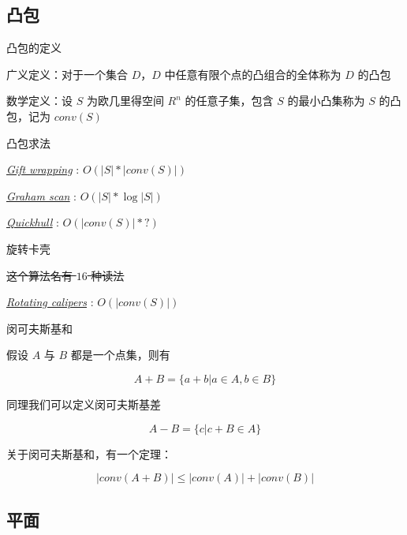 \documentclass[UTF8]{beamer}
\begin{document}
		\subsection{凸包}

			\begin{frame}{凸包的定义}

			广义定义：对于一个集合 $D$，$D$ 中任意有限个点的凸组合的全体称为 $D$ 的凸包

			数学定义：设 $S$ 为欧几里得空间 $R^n$ 的任意子集，包含 $S$ 的最小凸集称为 $S$ 的凸包，记为 $conv(S)$

			\end{frame}

			\begin{frame}{凸包求法}

			\href{Gift_wrapping_algorithm.gif}{\emph{\underline{Gift wrapping}}} : $O(|S|*|conv(S)|)$ 

			\href{Graham_scan.gif}{\emph{\underline{Graham scan}}} : $O(|S|*\log |S|)$

			\href{Quickhull.gif}{\emph{\underline{Quickhull}}} : $O(|conv(S)|*?)$

			\end{frame}

			\begin{frame}{旋转卡壳}

			\sout{这个算法名有 $16$ 种读法}

			\href{Rotating_calipers.gif}{\emph{\underline{Rotating calipers}}} : $O(|conv(S)|)$

			\end{frame}

			\begin{frame}{闵可夫斯基和}

			假设 $A$ 与 $B$ 都是一个点集，则有

			$$
			A + B = \{ a + b | a \in A, b \in B \}
			$$

			同理我们可以定义闵可夫斯基差

			$$
			A - B = \{ c | c + B \in A \}
			$$

			\pause

			关于闵可夫斯基和，有一个定理：

			$$
			|conv(A+B)| \le |conv(A)| + |conv(B)|
			$$

			\end{frame}

		\subsection{平面}
\end{document}
